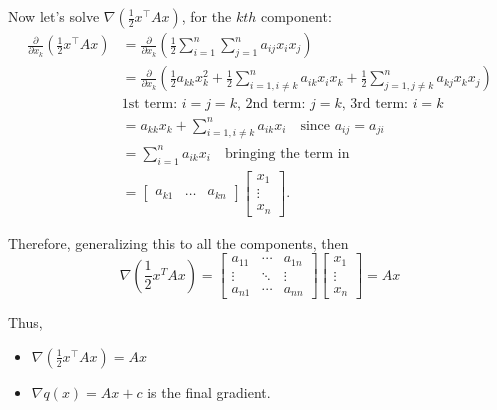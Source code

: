 \begin{example}
    Now let's solve $\nabla\left(\frac{1}{2} x^\top A x\right)$, for the $kth$ component:
    \begin{align*}
     \frac{\partial}{\partial x_k} \left(\frac{1}{2} x^\top A x\right) &= \frac{\partial}{\partial x_k} \left( \frac{1}{2} \sum_{i=1}^n \sum_{j=1}^n a_{ij} x_i x_j \right) \\
    &= \frac{\partial}{\partial x_k} \left( \frac{1}{2} a_{kk} x_k^2 + \frac{1}{2} \sum_{i=1, i \neq k}^n a_{ik} x_i x_k + \frac{1}{2} \sum_{j=1, j \neq k}^n a_{kj} x_k x_j \right) \\
    & \text{1st term: $i=j=k$, 2nd term: $j=k$, 3rd term: $i=k$} \\
    &= a_{kk} x_k + \sum_{i=1,i \neq k}^n a_{ik} x_i \quad \text{since $a_{ij} = a_{ji}$}\\
    &= \sum_{i=1}^n a_{ik} x_i \quad \text{bringing the term in} \\ 
    &= \begin{bmatrix}
    a_{k1} & \dots & a_{kn}
    \end{bmatrix}
    \begin{bmatrix}
    x_1 \\
    \vdots \\
    x_n
    \end{bmatrix}.
    \end{align*}

    Therefore, generalizing this to all the components, then \[
        \nabla \left( \frac{1}{2} x^T A x \right) =
        \begin{bmatrix}
        a_{11} & \cdots & a_{1n} \\
        \vdots & \ddots & \vdots \\
        a_{n1} & \cdots & a_{nn}
        \end{bmatrix}
        \begin{bmatrix}
        x_1 \\
        \vdots \\
        x_n
        \end{bmatrix}
        = A x
        \]
        \vspace{1em}

    Thus,
    \begin{itemize}
        \item $\nabla\left(\frac{1}{2} x^\top A x\right) = A x$
        \item $\boxed{\nabla q(x) = A x + c}$ is the final gradient. 
    \end{itemize}
    \vspace{1em}


\end{example}
